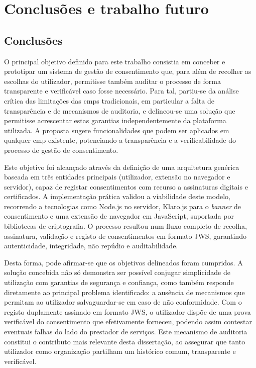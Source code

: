 \chapter{Conclusões e trabalho futuro}
\label{cap:conclusoes}

\section{Conclusões}

O principal objetivo definido para este trabalho consistia em conceber e prototipar um sistema de gestão de consentimento que, para além de recolher as escolhas do utilizador, permitisse também auditar o processo de forma transparente e verificável caso fosse necessário. Para tal, partiu-se da análise crítica das limitações das \acrshort{cmp}s tradicionais, em particular a falta de transparência e de mecanismos de auditoria, e delineou-se uma solução que permitisse acrescentar estas garantias independentemente da plataforma utilizada. A proposta sugere funcionalidades que podem ser aplicados em qualquer \acrshort{cmp} existente, potenciando a transparência e a verificabilidade do processo de gestão de consentimento.

Este objetivo foi alcançado através da definição de uma arquitetura genérica baseada em três entidades principais (utilizador, extensão no navegador e servidor), capaz de registar consentimentos com recurso a assinaturas digitais e certificados. A implementação prática validou a viabilidade deste modelo, recorrendo a tecnologias como Node.js no servidor, Klaro.js para o \textit{banner} de consentimento e uma extensão de navegador em JavaScript, suportada por bibliotecas de criptografia. O processo resultou num fluxo completo de recolha, assinatura, validação e registo de consentimentos em formato JWS, garantindo autenticidade, integridade, não repúdio e auditabilidade.

Desta forma, pode afirmar-se que os objetivos delineados foram cumpridos. A solução concebida não só demonstra ser possível conjugar simplicidade de utilização com garantias de segurança e confiança, como também responde diretamente ao principal problema identificado: a ausência de mecanismos que permitam ao utilizador salvaguardar-se em caso de não conformidade. Com o registo duplamente assinado em formato JWS, o utilizador dispõe de uma prova verificável do consentimento que efetivamente forneceu, podendo assim contestar eventuais falhas do lado do prestador de serviços. Este mecanismo de auditoria constitui o contributo mais relevante desta dissertação, ao assegurar que tanto utilizador como organização partilham um histórico comum, transparente e verificável.

